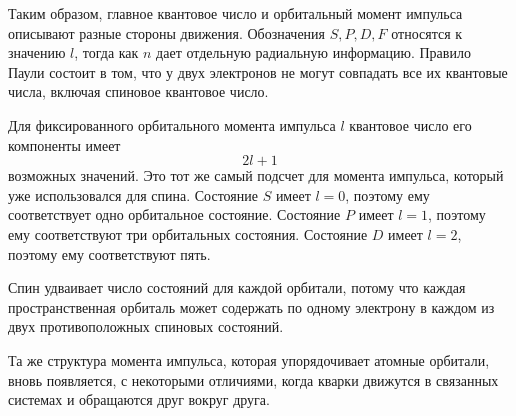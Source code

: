 Таким образом, главное квантовое число и орбитальный момент импульса описывают разные стороны движения. Обозначения \(S,P,D,F\) относятся к значению \(l\), тогда как \(n\) дает отдельную радиальную информацию. Правило Паули состоит в том, что у двух электронов не могут совпадать все их квантовые числа, включая спиновое квантовое число.

\begin{classroomqa}
\end{classroomqa}

Для фиксированного орбитального момента импульса \(l\) квантовое число его компоненты имеет
\begin{equation}
2l+1
\end{equation}
возможных значений. Это тот же самый подсчет для момента импульса, который уже использовался для спина. Состояние \(S\) имеет \(l=0\), поэтому ему соответствует одно орбитальное состояние. Состояние \(P\) имеет \(l=1\), поэтому ему соответствуют три орбитальных состояния. Состояние \(D\) имеет \(l=2\), поэтому ему соответствуют пять.

Спин удваивает число состояний для каждой орбитали, потому что каждая пространственная орбиталь может содержать по одному электрону в каждом из двух противоположных спиновых состояний.

\begin{classroomqa}
\end{classroomqa}

Та же структура момента импульса, которая упорядочивает атомные орбитали, вновь появляется, с некоторыми отличиями, когда кварки движутся в связанных системах и обращаются друг вокруг друга.